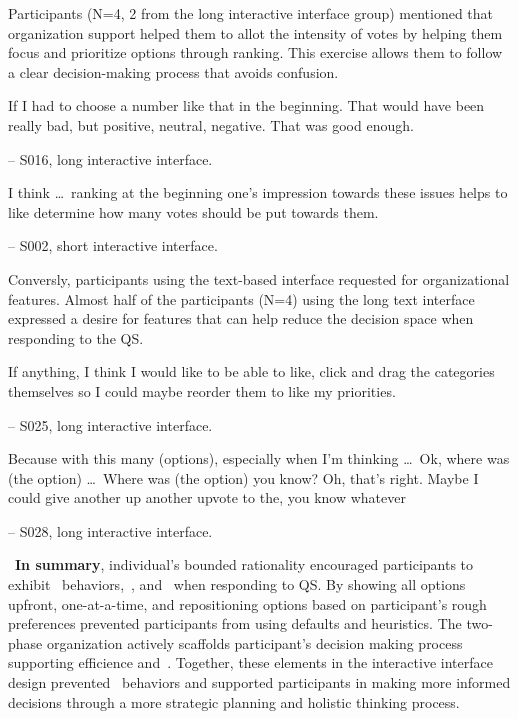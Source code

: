Participants (N=4, 2 from the long interactive interface group) mentioned that organization support helped them to allot the intensity of votes by helping them focus and prioritize options through ranking. This exercise allows them to follow a clear decision-making process that avoids confusion.

\begin{displayquote}
If I had to choose a number like that in the beginning. That would have been really bad, but positive, neutral, negative. That was good enough.

\noindent \hfill -- S016, long interactive interface.
\end{displayquote}

\begin{displayquote}
I think \ldots\ ranking at the beginning one's impression towards these issues helps to like determine how many votes should be put towards them. 

\noindent \hfill -- S002, short interactive interface.
\end{displayquote}

Conversly, participants using the text-based interface requested for organizational features. Almost half of the participants (N=4) using the long text interface expressed a desire for features that can help reduce the decision space when responding to the QS.

\begin{displayquote}
If anything, I think I would like to be able to like, click and drag the categories themselves so I could maybe reorder them to like my priorities.

\noindent \hfill -- S025, long interactive interface.
\end{displayquote}

\begin{displayquote}
Because with this many (options), especially when I'm thinking \ldots\ Ok, where was (the option) \ldots\ Where was (the option) you know? Oh, that's right. Maybe I could give another up another upvote to the, you know whatever~\bracketellipsis

\noindent \hfill -- S028, long interactive interface.
\end{displayquote}

~\textbf{In summary}, individual's bounded rationality encouraged participants to exhibit~\underline{} behaviors,~\underline{}, and~\underline{} when responding to QS. By showing all options upfront, one-at-a-time, and repositioning options based on participant's rough preferences prevented participants from using defaults and heuristics. The two-phase organization actively scaffolds participant's decision making process supporting efficience\underline{} and~\underline{}. Together, these elements in the interactive interface design prevented~\underline{} behaviors and supported participants in making more informed decisions through a more strategic planning and holistic thinking process.

